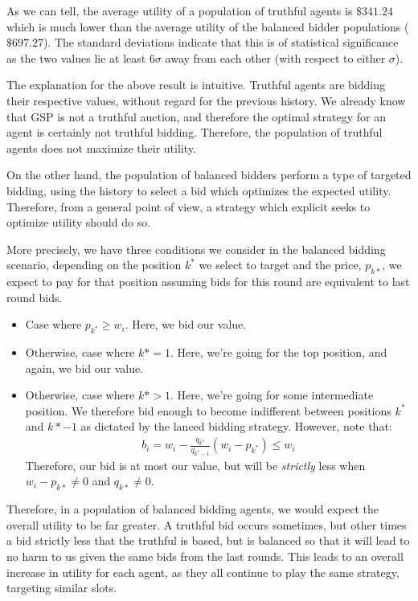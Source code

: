 \documentclass[11pt]{article}
\begin{document}
\begin{enumerate}
\begin{enumerate}
    As we can tell, the average utility of a population of truthful agents is $\$341.24$ which is much lower than the average utility of the balanced bidder populations ($\$697.27$). The standard deviations indicate that this is of statistical significance as the two values lie at least $6\sigma$ away from each other (with respect to either $\sigma$).

    The explanation for the above result is intuitive. Truthful agents are bidding their respective values, without regard for the previous history. We already know that GSP is not a truthful auction, and therefore the optimal strategy for an agent is certainly not truthful bidding. Therefore, the population of truthful agents does not maximize their utility. 

    On the other hand, the population of balanced bidders perform a type of targeted bidding, using the history to select a bid which optimizes the expected utility. Therefore, from a general point of view, a strategy which explicit seeks to optimize utility should do so.

    More precisely, we have three conditions we consider in the balanced bidding scenario, depending on the position $k^*$ we select to target and the price, $p_{k*}$, we expect to pay for that position assuming bids for this round are equivalent to last round bids. 

    \begin{itemize}
      \item Case where $p_{k^*} \geq w_i$. Here, we bid our value. 
      \item Otherwise, case where $k* = 1$. Here, we're going for the top position, and again, we bid our value.
      \item Otherwise, case where $k* > 1$. Here, we're going for some intermediate position. We therefore bid enough to become indifferent between positions $k^*$ and $k*-1$ as dictated by the lanced bidding strategy. However, note that:
      \begin{align*}
        b_i = w_i - \frac{q_{k^*}}{q_{k^{*}-1}}(w_i - p_{k^*}) \leq w_i
      \end{align*}
      Therefore, our bid is at most our value, but will be {\it strictly} less when $w_{i} - p_{k*} \neq 0$ and $q_{k*} \neq 0$.
    \end{itemize}
    Therefore, in a population of balanced bidding agents, we would expect the overall utility to be far greater. A truthful bid occurs sometimes, but other times a bid strictly less that the truthful is based, but is balanced so that it will lead to no harm to us given the same bids from the last rounds. This leads to an overall increase in utility for each agent, as they all continue to play the same strategy, targeting similar slots.


\end{enumerate}
\end{enumerate}
\end{document}
